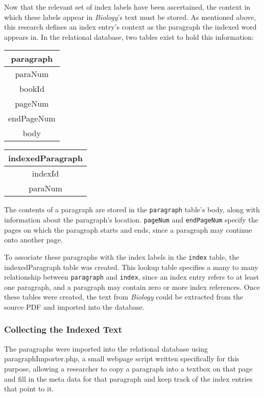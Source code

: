 Now that the relevant set of index labels have been ascertained, the context in which these labels appear in {\it Biology}'s text must be stored.
As mentioned above, this research defines an index entry's context as the paragraph the indexed word appears in.
In the relational database, two tables exist to hold this information:

\begin{center}
\begin{tabular}{|c|}
\hline 
\textbf{paragraph} \\ 
\hline 
paraNum \\ 
\hline 
bookId \\ 
\hline 
pageNum \\ 
\hline 
endPageNum \\ 
\hline 
body \\ 
\hline 
\end{tabular}
\end{center}

\begin{center}
\begin{tabular}{|c|}
\hline 
\textbf{indexedParagraph} \\ 
\hline 
indexId \\ 
\hline 
paraNum \\ 
\hline 
\end{tabular} 
\end{center}

The contents of a paragraph are stored in the {\tt paragraph} table's body, along with information about the paragraph's location.
{\tt pageNum} and {\tt endPageNum} specify the pages on which the paragraph starts and ends, since a paragraph may continue onto another page.

To associate these paragraphs with the index labels in the {\tt index} table, the indexedParagraph table was created.
This lookup table specifies a many to many relationship between {\tt paragraph} and {\tt index}, since an index entry refers to at least one paragraph, and a paragraph may contain zero or more index references. Once these tables were created, the text from {\it Biology} could be extracted from the source PDF and imported into the database.

\subsubsection{Collecting the Indexed Text}

The paragraphs were imported into the relational database using paragraphImporter.php, a small webpage script written specifically for this purpose, allowing a researcher to copy a paragraph into a textbox on that page and fill in the meta data for that paragraph and keep track of the index entries that point to it.

